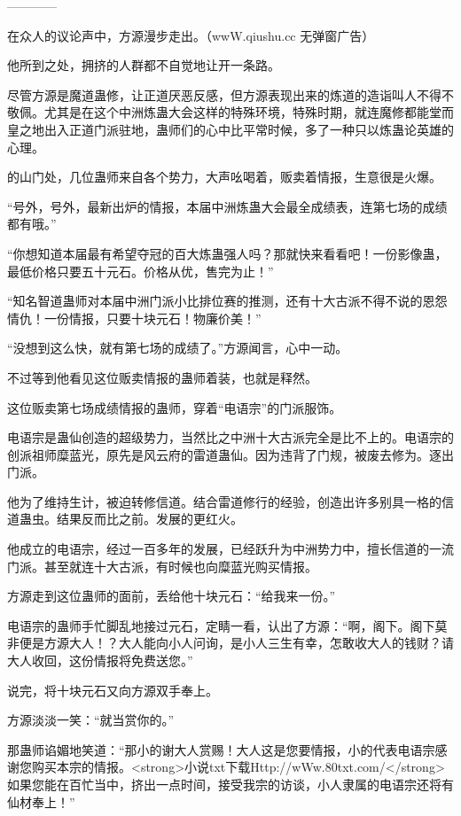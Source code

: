 
\begin{this_body}

------------

在众人的议论声中，方源漫步走出。（wwW.qiushu.cc 无弹窗广告）

他所到之处，拥挤的人群都不自觉地让开一条路。

尽管方源是魔道蛊修，让正道厌恶反感，但方源表现出来的炼道的造诣叫人不得不敬佩。尤其是在这个中洲炼蛊大会这样的特殊环境，特殊时期，就连魔修都能堂而皇之地出入正道门派驻地，蛊师们的心中比平常时候，多了一种只以炼蛊论英雄的心理。

的山门处，几位蛊师来自各个势力，大声吆喝着，贩卖着情报，生意很是火爆。

“号外，号外，最新出炉的情报，本届中洲炼蛊大会最全成绩表，连第七场的成绩都有哦。”

“你想知道本届最有希望夺冠的百大炼蛊强人吗？那就快来看看吧！一份影像蛊，最低价格只要五十元石。价格从优，售完为止！”

“知名智道蛊师对本届中洲门派小比排位赛的推测，还有十大古派不得不说的恩怨情仇！一份情报，只要十块元石！物廉价美！”

“没想到这么快，就有第七场的成绩了。”方源闻言，心中一动。

不过等到他看见这位贩卖情报的蛊师着装，也就是释然。

这位贩卖第七场成绩情报的蛊师，穿着“电语宗”的门派服饰。

电语宗是蛊仙创造的超级势力，当然比之中洲十大古派完全是比不上的。电语宗的创派祖师糜蓝光，原先是风云府的雷道蛊仙。因为违背了门规，被废去修为。逐出门派。

他为了维持生计，被迫转修信道。结合雷道修行的经验，创造出许多别具一格的信道蛊虫。结果反而比之前。发展的更红火。

他成立的电语宗，经过一百多年的发展，已经跃升为中洲势力中，擅长信道的一流门派。甚至就连十大古派，有时候也向糜蓝光购买情报。

方源走到这位蛊师的面前，丢给他十块元石：“给我来一份。”

电语宗的蛊师手忙脚乱地接过元石，定睛一看，认出了方源：“啊，阁下。阁下莫非便是方源大人！？大人能向小人问询，是小人三生有幸，怎敢收大人的钱财？请大人收回，这份情报将免费送您。”

说完，将十块元石又向方源双手奉上。

方源淡淡一笑：“就当赏你的。”

那蛊师谄媚地笑道：“那小的谢大人赏赐！大人这是您要情报，小的代表电语宗感谢您购买本宗的情报。<strong>小说txt下载Http://wWw.80txt.com/</strong>如果您能在百忙当中，挤出一点时间，接受我宗的访谈，小人隶属的电语宗还将有仙材奉上！”


\end{this_body}
